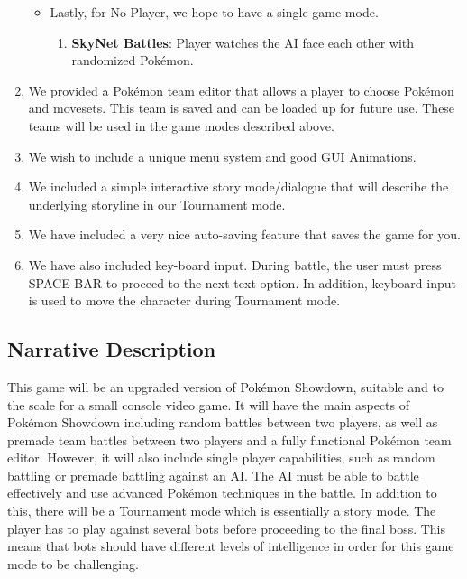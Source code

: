 \documentclass{scrreprt}
\begin{document}
\begin{enumerate}
\begin{itemize}
\begin{enumerate}
				\end{enumerate}
			\item Lastly, for No-Player, we hope to have a single game mode.
				\begin{enumerate}
					\item \textbf{SkyNet Battles}: Player watches the AI face each other with randomized Pok\'emon.
				\end{enumerate}
		\end{itemize}
	\item We provided a Pok\'emon team editor that allows a player to choose Pok\'emon and movesets. This team is saved and can be loaded up for future use. These teams will be used in the game modes described above.
	\item We wish to include a unique menu system and good GUI Animations.
	\item We included a simple interactive story mode/dialogue that will describe the underlying storyline in our Tournament mode. 
	\item We have included a very nice auto-saving feature that saves the game for you. 
	\item We have also included key-board input. During battle, the user must press SPACE BAR to proceed to the next text option. In addition, keyboard input is used to move the character during Tournament mode. 
\end{enumerate}

\subsection{Narrative Description}
	This game will be an upgraded version of Pok\'emon Showdown, suitable and to the scale for a small console video game. It will have the main aspects of Pok\'emon Showdown including random battles between two players, as well as premade team battles between two players and a fully functional Pok\'emon team editor. However, it will also include single player capabilities, such as random battling or premade battling against an AI. The AI must be able to battle effectively and use advanced Pok\'emon techniques in the battle. In addition to this, there will be a Tournament mode which is essentially a story mode. The player has to play against several bots before proceeding to the final boss. This means that bots should have different levels of intelligence in order for this game mode to be challenging. 
\end{document}
